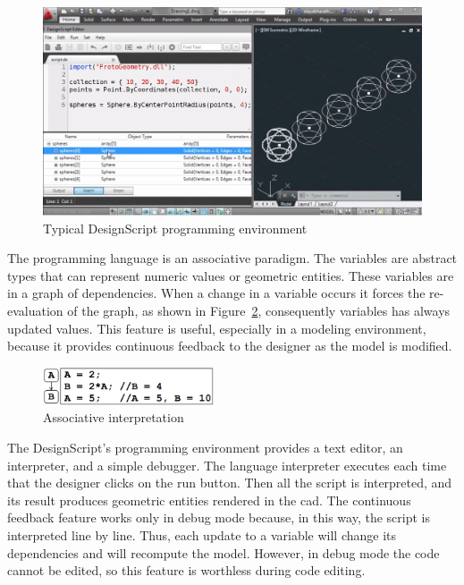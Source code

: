 \begin{figure}[!htbp]
  \centering
  \includegraphics[width=1.0\textwidth]{images/designScriptIDE}
    \caption{Typical DesignScript programming environment} 
  \label{fig:ds}
\end{figure} 

The programming language is an associative paradigm. The variables are abstract types that can represent numeric values or geometric entities. These variables are in a graph of dependencies. When a change in a variable occurs it forces the re-evaluation of the graph, as shown in Figure~\ref{fig:designscript}, consequently variables has always updated values. This feature is useful, especially in a modeling environment, because it provides continuous feedback to the designer as the model is modified.

\begin{figure}
  \begin{center}
    \includegraphics[width=0.45\textwidth]{images/designscript}
  \end{center}
 \caption{Associative interpretation}  
    \label{fig:designscript}
\end{figure}

The DesignScript's programming environment provides a text editor, an interpreter, and a simple debugger. The language interpreter executes each time that the designer clicks on the run button. Then all the script is interpreted, and its result produces geometric entities rendered in the \gls{cad}. The continuous feedback feature works only in debug mode because, in this way, the script is interpreted line by line. Thus, each update to a variable will change its dependencies and will recompute the model. However, in debug mode the code cannot be edited, so this feature is worthless during code editing.

